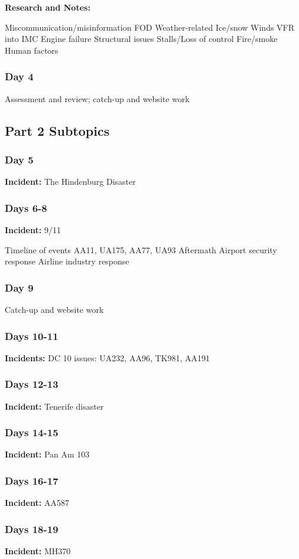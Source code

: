 \documentclass[12pt]{article}
\begin{document}
\textbf{Research and Notes:}
\begin{outline}
    \1 Miscommunication/misinformation
\1 FOD
\1 Weather-related
\2 Ice/snow
\2 Winds
\2 VFR into IMC
\1 Engine failure
\1 Structural issues
\1 Stalls/Loss of control
\1 Fire/smoke
\1 Human factors
\end{outline}
\subsubsection{Day 4}
Assessment and review; catch-up and website work
\subsection{Part 2 Subtopics}
\subsubsection{Day 5}
\textbf{Incident:} The Hindenburg Disaster
\subsubsection{Days 6-8}
\textbf{Incident:} 9/11
\begin{outline}
    \1 Timeline of events
\1 AA11, UA175, AA77, UA93
\1 Aftermath
\1 Airport security response
\1 Airline industry response
\end{outline}
\subsubsection{Day 9}
Catch-up and website work
\subsubsection{Days 10-11}
\textbf{Incidents:} DC 10 issues: UA232, AA96, TK981, AA191
\subsubsection{Days 12-13}
\textbf{Incident:} Tenerife disaster
\subsubsection{Days 14-15}
\textbf{Incident:} Pan Am 103
\subsubsection{Days 16-17}
\textbf{Incident:} AA587
\subsubsection{Days 18-19}
\textbf{Incident:} MH370
\end{document}
